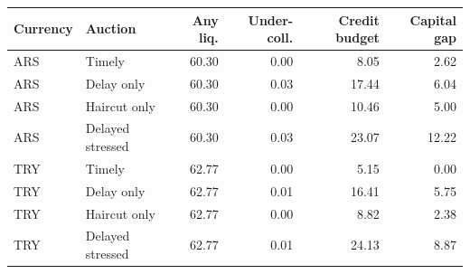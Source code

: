\begin{tabular}{llrrrr}
\toprule
Currency & Auction & Any liq. & Under-coll. & Credit budget & Capital gap \\
\midrule
ARS & Timely & 60.30 & 0.00 & 8.05 & 2.62 \\
ARS & Delay only & 60.30 & 0.03 & 17.44 & 6.04 \\
ARS & Haircut only & 60.30 & 0.00 & 10.46 & 5.00 \\
ARS & Delayed stressed & 60.30 & 0.03 & 23.07 & 12.22 \\
TRY & Timely & 62.77 & 0.00 & 5.15 & 0.00 \\
TRY & Delay only & 62.77 & 0.01 & 16.41 & 5.75 \\
TRY & Haircut only & 62.77 & 0.00 & 8.82 & 2.38 \\
TRY & Delayed stressed & 62.77 & 0.01 & 24.13 & 8.87 \\
\bottomrule
\end{tabular}
